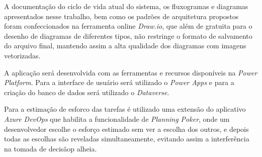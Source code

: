 	A documentação do ciclo de vida atual do sistema, os fluxogramas e diagramas apresentados nesse trabalho, bem como os padrões de arquitetura propostos foram confeccionados
	na ferramenta online \textit{Draw.io}, 
	que além de gratuita para o desenho de diagramas de diferentes 
	tipos, não restringe o formato de salvamento do arquivo final, mantendo 
	assim a alta qualidade dos diagramas com imagens vetorizadas. 
	
	A aplicação será desenvolvida com as ferramentas e recursos disponíveis na \textit{Power Platform}. Para a interface de usuário será utilizado o \textit{Power Apps} e para a
	criação do banco de dados será utilizado o \textit{Dataverse}.

	Para a estimação de esforco das tarefas é utilizado uma extensão do aplicativo \textit{Azure DevOps} que habilita a funcionalidade de \textit{Planning Poker}, onde um desenvolvedor escolhe o esforço estimado
	sem ver a escolha dos outros, e depois todas as escolhas são reveladas simultaneamente, evitando assim a interferência na tomada de decisãop alheia.
	